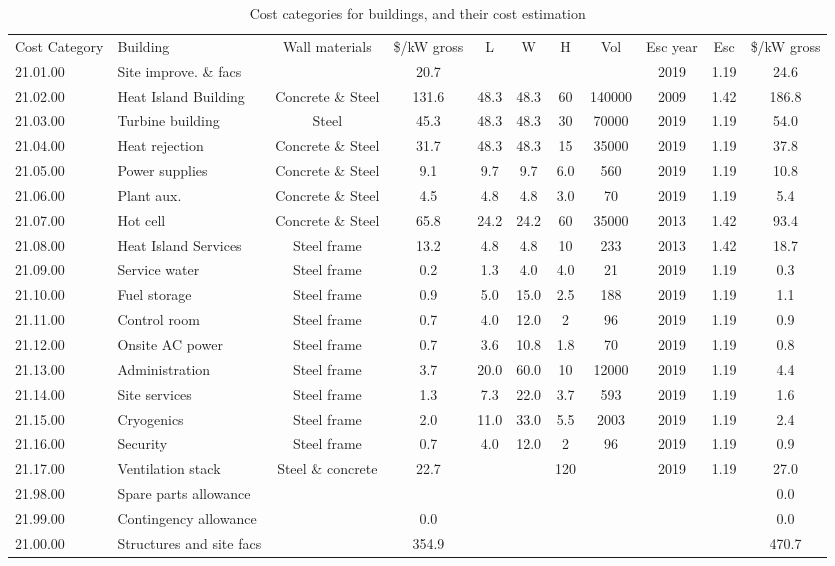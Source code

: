\begin{table}[h!] 
    \begin{tiny}
    \centering
    \begin{tabular}{l l  c c c c c c c c c }
Cost Category	&	Building	&	Wall materials	&	 \$/kW gross	&	L	&	W	&	H	&	Vol	&	Esc year	&	Esc	&\$/kW gross	\\
21.01.00	&	Site improve. \& facs	&		&	20.7	&		&		&		&		&	2019	&	1.19	&	24.6	\\
21.02.00	&	Heat Island Building	&	Concrete \& Steel	&	131.6	&	48.3	&	48.3	&	60	&	140000	&	2009	&	1.42	&	186.8	\\
21.03.00	&	Turbine building	&	Steel 	&	45.3	&	48.3	&	48.3	&	30	&	70000	&	2019	&	1.19	&	54.0	\\
21.04.00	&	Heat rejection 	&	Concrete \& Steel	&	31.7	&	48.3	&	48.3	&	15	&	35000	&	2019	&	1.19	&	37.8	\\
21.05.00	&	Power supplies	&	Concrete \& Steel	&	9.1	&	9.7	&	9.7	&	6.0	&	560	&	2019	&	1.19	&	10.8	\\
21.06.00	&	Plant aux.	&	Concrete \& Steel	&	4.5	&	4.8	&	4.8	&	3.0	&	70	&	2019	&	1.19	&	5.4	\\
21.07.00	&	Hot cell	&	Concrete \& Steel	&	65.8	&	24.2	&	24.2	&	60	&	35000	&	2013	&	1.42	&	93.4	\\
21.08.00	&	Heat Island Services	&	Steel frame	&	13.2	&	4.8	&	4.8	&	10	&	233	&	2013	&	1.42	&	18.7	\\
21.09.00	&	Service water	&	Steel frame	&	0.2	&	1.3	&	4.0	&	4.0	&	21	&	2019	&	1.19	&	0.3	\\
21.10.00	&	Fuel storage	&	Steel frame	&	0.9	&	5.0	&	15.0	&	2.5	&	188	&	2019	&	1.19	&	1.1	\\
21.11.00	&	Control room	&	Steel frame	&	0.7	&	4.0	&	12.0	&	2	&	96	&	2019	&	1.19	&	0.9	\\
21.12.00	&	Onsite AC power	&	Steel frame	&	0.7	&	3.6	&	10.8	&	1.8	&	70	&	2019	&	1.19	&	0.8	\\
21.13.00	&	Administration	&	Steel frame	&	3.7	&	20.0	&	60.0	&	10	&	12000	&	2019	&	1.19	&	4.4	\\
21.14.00	&	Site services	&	Steel frame	&	1.3	&	7.3	&	22.0	&	3.7	&	593	&	2019	&	1.19	&	1.6	\\
21.15.00	&	Cryogenics	&	Steel frame	&	2.0	&	11.0	&	33.0	&	5.5	&	2003	&	2019	&	1.19	&	2.4	\\
21.16.00	&	Security	&	Steel frame	&	0.7	&	4.0	&	12.0	&	2	&	96	&	2019	&	1.19	&	0.9	\\
21.17.00	&	Ventilation stack	&	Steel \& concrete 	&	22.7	&		&		&	120	&		&	2019	&	1.19	&	27.0	\\
21.98.00	&	Spare parts allowance	&		&		&		&		&		&		&		&		&	0.0	\\
21.99.00	&	Contingency allowance	&		&	0.0	&		&		&		&		&		&		&	0.0	\\
21.00.00	&	Structures and site facs	&		&	354.9	&		&		&		&		&		&		&	470.7	\\
    \end{tabular}															
    \end{tiny} 																	
    \caption{Cost categories for buildings, and their cost estimation}	
    \label{tab:buildings}
\end{table} 




